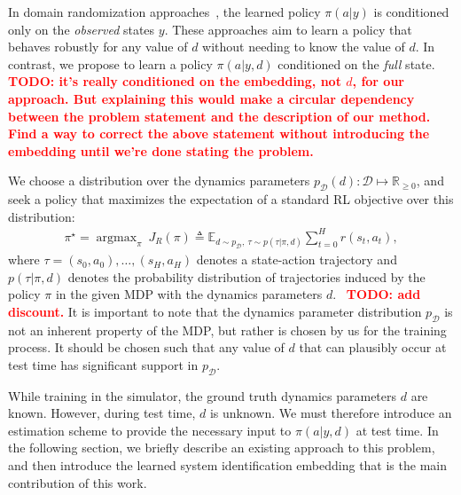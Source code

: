 \documentclass{article}
\newcommand{\R}{\mathbb{R}}
\newcommand{\E}{\mathbb{E}}
\newcommand{\TODO}[1]{\textcolor{red}{\textbf{TODO: #1}}}
\newcommand{\cA}{\mathcal{A}}
\newcommand{\cS}{\mathcal{S}}
\DeclareMathOperator*{\argmax}{argmax}
\newcommand{\sysid}{dynamics}
\newcommand{\idset}{\mathcal{D}}
\newcommand{\obvar}{y}
\newcommand{\idvar}{d}
\newcommand{\idpdf}{p_{\idset}}
\begin{document}
In domain randomization approaches~\citep{antonova-pivoting-corr17, zhu-RL-IL-diverse},
the learned policy $\pi(a|\obvar)$ is conditioned only on the \emph{observed} states $\obvar$.
These approaches aim to learn a policy that behaves robustly for any value of $d$ without needing to know the value of $d$.
In contrast, we propose to learn a policy 
$\pi(a|\obvar,\idvar)$ conditioned on the \emph{full} state.
\TODO{it's really conditioned on the embedding, not $\idvar$, for our approach.
But explaining this would make a circular dependency between the problem statement and the description of our method.
Find a way to correct the above statement without introducing the embedding until we're done stating the problem.}

We choose a distribution over the \sysid{} parameters $\idpdf(\idvar) : \idset \mapsto \R_{\geq 0}$,
and seek a policy that maximizes the expectation of a standard RL objective over this distribution:
\begin{equation}\begin{split}
\pi^\star = \argmax_\pi\ J_R(\pi) \triangleq \E_{\idvar \sim \idpdf,\ \tau \sim p(\tau|\pi,\idvar)} \sum_{t = 0}^H
r(s_t, a_t),
\label{objective}
\end{split}\end{equation}
where $\tau = (s_0, a_0), \dots, (s_H, a_H)$ denotes a state-action trajectory
and $p(\tau | \pi, \idvar)$ denotes the probability distribution of trajectories induced by the policy $\pi$
in the given MDP with the \sysid{} parameters $\idvar$.
~\TODO{add discount.}
It is important to note that the \sysid{} parameter distribution $\idpdf$ is not an inherent property of the MDP,
but rather is chosen by us for the training process.
It should be chosen such that any value of $\idvar$ that can plausibly occur at test time has significant support in $\idpdf$.

While training in the simulator, the ground truth \sysid{} parameters $\idvar$ are known.
However, during test time, $\idvar$ is unknown.
We must therefore introduce an estimation scheme to provide the necessary input to $\pi(a|\obvar,\idvar)$ at test time.
In the following section, we briefly describe an existing approach to this problem,
and then introduce the learned system identification embedding that is the main contribution of this work.
\end{document}
